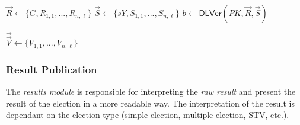\begin{algorithm}[ht]
    \DontPrintSemicolon
    \caption{$\mathsf{PartialDecryptionVer}(\vec{\vec{e}}, \vec{\vec{S}}, PK, sY)$}
    \label{alg: partial decryption ver}
    
    $\vec{R} \gets \{ G, R_{1, 1}, ..., R_{n, \ell} \}$ \;
    $\vec{S} \gets \{ sY, S_{1, 1}, ..., S_{n, \ell} \}$ \;
    $b \gets \mathsf{DLVer}(PK, \vec{R}, \vec{S})$ 
     
\end{algorithm}

\begin{algorithm}[ht]
    \DontPrintSemicolon
    \caption{$\mathsf{FinalizeDecryption} (\vec{\vec{e}}, \vec{\vec{\vec{S}}})$}
    \label{alg: finalize decryption}
    
    $\vec{\vec{V}} \gets \{ V_{1, 1}, ..., V_{n, \ell} \}$ \;
     
\end{algorithm}


\clearpage
\subsubsection{Result Publication} \label{sec: result publication}
The \textit{results module} is responsible for interpreting the \textit{raw result} and present the result of the election in a more readable way. The interpretation of the result is dependant on the election type (simple election, multiple election, STV, etc.).

